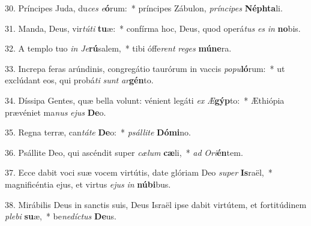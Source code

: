 30. Príncipes Juda, du\textit{ces} \textit{e}\textbf{ó}rum:~*  príncipes Zábulon, \textit{prín}\textit{ci}\textit{pes} \textbf{Néph}\textbf{ta}li.\

31. Manda, Deus, vir\textit{tú}\textit{ti} \textbf{tu}æ:~*  confírma hoc, Deus, quod operá\textit{tus} \textit{es} \textit{in} \textbf{no}bis.\

32. A templo tuo \textit{in} \textit{Je}\textbf{rú}salem,~*  tibi óffe\textit{rent} \textit{re}\textit{ges} \textbf{mú}\textbf{ne}ra.\

33. Increpa feras arúndinis, congregátio taurórum in vaccis \textit{po}\textit{pu}\textbf{ló}rum:~*  ut exclúdant eos, qui probá\textit{ti} \textit{sunt} \textit{ar}\textbf{gén}to.\

34. Díssipa Gentes, quæ bella volunt: vénient legáti \textit{ex} \textit{Æ}\textbf{gýp}to:~*  Æthiópia prævéniet ma\textit{nus} \textit{e}\textit{jus} \textbf{De}o.\

35. Regna terræ, can\textit{tá}\textit{te} \textbf{De}o:~*  \textit{psál}\textit{li}\textit{te} \textbf{Dó}\textbf{mi}no.\

36. Psállite Deo, qui ascéndit super \textit{cæ}\textit{lum} \textbf{cæ}li,~*  \textit{ad} \textit{O}\textit{ri}\textbf{én}tem.\

37. Ecce dabit voci suæ vocem virtútis, date glóriam Deo \textit{su}\textit{per} \textbf{Is}raël,~*  magnificéntia ejus, et virtus \textit{e}\textit{jus} \textit{in} \textbf{nú}\textbf{bi}bus.\

38. Mirábilis Deus in sanctis suis, Deus Israël ipse dabit virtútem, et fortitúdinem \textit{ple}\textit{bi} \textbf{su}æ,~*  be\textit{ne}\textit{díc}\textit{tus} \textbf{De}us.\

